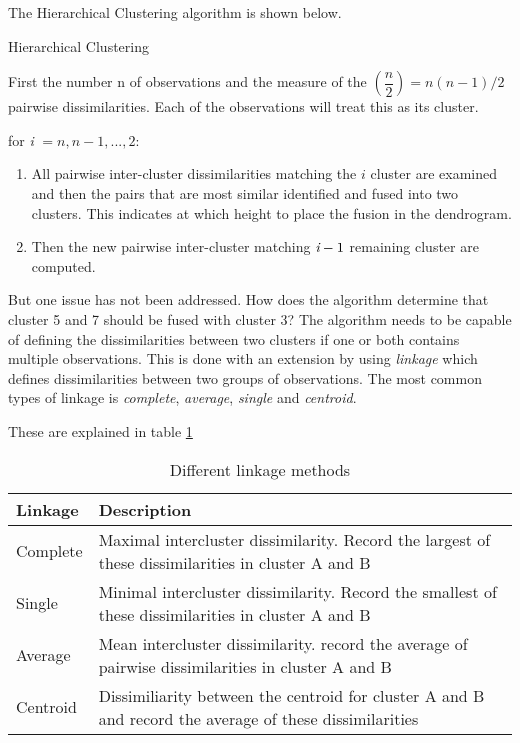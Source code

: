 The Hierarchical Clustering algorithm is shown below.

\begin{algorithm}
	\caption{Hierarchical Clustering}
	\label{algo:HierarchicalClustering}
	\begin{algorithmic}[1]
 		\State First the number n of observations and the measure of the $(\dfrac{n}{2}) =n(n-1)/2 $ pairwise dissimilarities. Each of the observations will treat this as its cluster.
 		
 		\State for \emph{i} $= n,n-1,...,2:$
 		\begin{enumerate}[label=(\alph*)]
 			\item All pairwise inter-cluster dissimilarities matching the $i$ cluster are examined and then the pairs that are most similar identified and fused into two clusters. This indicates at which height to place the fusion in the dendrogram.
 			\item Then the new pairwise inter-cluster matching $\emph{i}-1$ remaining cluster are computed.
 		\end{enumerate}
 	\end{algorithmic}
 \end{algorithm}

But one issue has not been addressed. How does the algorithm determine that cluster 5 and 7 should be fused with cluster 3? The algorithm needs to be capable of defining the dissimilarities between two clusters if one or both contains multiple observations. This is done with an extension by using \emph{linkage} which defines dissimilarities between two groups of observations. The most common types of linkage is \emph{complete}, \emph{average}, \emph{single} and
\emph{centroid}.

These are explained in table \ref{table:linkage}

\begin{table}
	\begin{center}
		\begin{tabular}{ | l | p{12cm} |}
			\hline
			Linkage & Description \\ \hline
			Complete & Maximal intercluster dissimilarity. Record the largest of these dissimilarities in cluster A and B \\ \hline
			Single & Minimal intercluster dissimilarity. Record the smallest of these dissimilarities in cluster A and B \\ \hline
			Average & Mean intercluster dissimilarity. record the average of pairwise dissimilarities in cluster A and B\\
			\hline
			Centroid & Dissimiliarity between the centroid for cluster A and B and record the average of these dissimilarities
			\\
			\hline
		\end{tabular}
	\end{center}
	\caption{Different linkage methods}
	\label{table:linkage}
\end{table}


